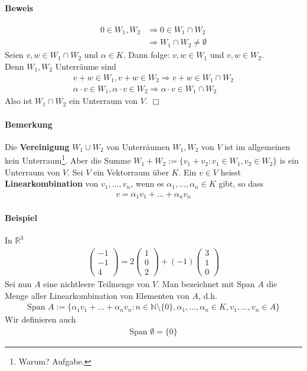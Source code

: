 \documentclass[11pt]{report}
\newcommand*\Zb[1] {\mathbb{#1}}
\newcommand*\f[1] {\textbf{#1}}
\begin{document}
\paragraph{Beweis}
\begin{align}
 0 \in W_1, W_2 &\Rightarrow 0 \in W_1 \cap W_2 \\
 &\Rightarrow W_1\cap W_2 \neq \emptyset
\end{align}
Seien $v, w \in W_1 \cap W_2$ und $\alpha \in K$. Dann folge: $v, w \in W_1$ und $v, w \in W_2$. \\
Denn $W_1, W_2$ Unterräume sind 
\begin{align}
 v + w \in W_1, v + w \in W_2 \Rightarrow v + w \in W_1 \cap W_2 \\
 \alpha\cdot v \in W_1, \alpha\cdot v \in W_2 \Rightarrow \alpha\cdot v \in W_1 \cap W_2 
\end{align}
Also ist  $W_1 \cap W_2$ ein Unterraum von $V$. \hfill $\Box$
\paragraph{Bemerkung}
Die \f{Vereinigung} $W_1 \cup W_2$ von Unterräumen $W_1, W_2$ von $V$ ist im allgemeinen kein Unterraum\footnote{Warum? Aufgabe.}. Aber die Summe $W_1 + W_2 := \{v_1+ v_2: v_1 \in W_1, v_2 \in W_2\}$ is ein Unterraum von $V$.
Sei $V$ ein Vektorraum über $K$. Ein $v\in V$ heisst \f{Linearkombination} von $v_1,..., v_n$, wenn es $\alpha_1, ..., \alpha_n \in K$ gibt, so dass
\begin{align}
 v = \alpha_1 v_1 + ... + \alpha_n v_n
\end{align}
 \paragraph{Beispiel} In $\Zb{R}^3$
\begin{align}
 \begin{pmatrix} -1 \\ -1 \\ 4 \end{pmatrix} = 2 \begin{pmatrix} 1 \\ 0 \\ 2 \end{pmatrix}
+ (-1)  \begin{pmatrix} 3 \\ 1 \\ 0 \end{pmatrix}
\end{align}
Sei nun $A$ eine nichtleere Teilmenge von $V$. Man bezeichnet mit Span $A$ die Menge aller Linearkombination von Elementen von $A$, d.h.
\begin{align}
 \text{Span } A := \{\alpha_1 v_1 + ... +\alpha_n v_n: n \in \Zb{N}\setminus\{0\}, \alpha_1, ..., \alpha_n \in K, v_1, ..., v_n \in A\}
\end{align}
Wir definieren auch
\begin{align}
 \text{Span } \emptyset = \{0\}
\end{align}
\end{document}
